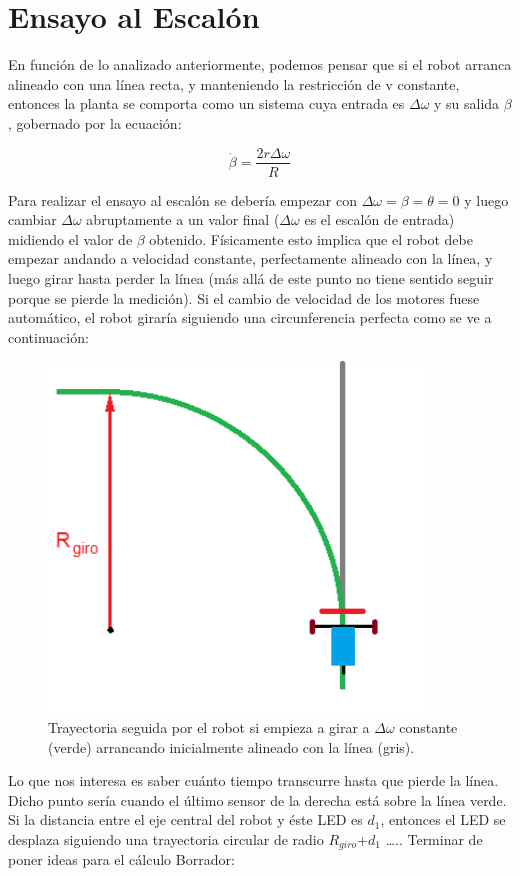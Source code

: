 \documentclass[10pt,conference,a4paper,onecolumn]{article}%
\begin{document}
\section{Ensayo al Escalón}

En función de lo analizado anteriormente, podemos pensar que si el robot arranca alineado con una línea recta, y manteniendo la restricción de v constante, entonces la planta se comporta como un sistema cuya entrada es $\Delta \omega$ y su salida $\beta $, gobernado por la ecuación:

\begin{equation}
\dot{\beta}= \frac{2r\Delta\omega}{R} 
\label{eq:sys_tot_teo} 
\end{equation}

Para realizar el ensayo al escalón se debería empezar con $\Delta \omega = \beta = \theta=0$  y luego cambiar $\Delta \omega$  abruptamente a un valor final ($\Delta \omega$  es el escalón de entrada) midiendo el valor de $\beta$ obtenido. Físicamente esto implica que el robot debe empezar andando a velocidad constante, perfectamente alineado con la línea, y luego girar hasta perder la línea (más allá de este punto no tiene sentido seguir porque se pierde la medición).
Si el cambio de velocidad de los motores fuese automático, el robot giraría siguiendo una circunferencia perfecta como se ve a continuación:

\begin{figure}[h]
\centering
\includegraphics[width=10cm]{./imagenes/carrito_Ensayo_escalon.png}
\caption{Trayectoria seguida por el robot si empieza a girar a $\Delta \omega $ constante (verde) arrancando inicialmente alineado con la línea (gris).}
\label{fig:carritoEsc}
\end{figure}
Lo que nos interesa es saber cuánto tiempo transcurre hasta que pierde la línea. Dicho punto sería cuando el último sensor de la derecha está sobre la línea verde. Si la distancia entre el eje central del robot y éste LED es $d_1$, entonces el LED se desplaza siguiendo una trayectoria circular de radio $R_{giro}$+$d_1$ …..
Terminar de poner ideas para el cálculo
Borrador:
\end{document}
